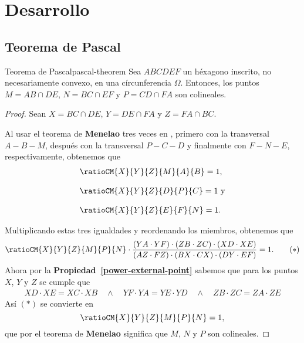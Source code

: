 \section{Desarrollo}



\subsection{Teorema de Pascal}

\begin{section-theorem.tcb}{Teorema de Pascal}{pascal-theorem}
    Sea $ABCDEF$ un héxagono inscrito, no necesariamente convexo, en una círcunferencia $\Omega$.
    Entonces, los puntos $M = AB \cap DE$, $N = BC \cap EF$ y $P = CD \cap FA$ son colineales.
\end{section-theorem.tcb}

\begin{proof}
    Sean $X = BC \cap DE$, $Y = DE \cap FA$ y $Z = FA \cap BC$.

    \begin{multicols}{2}
        \begin{figure}[H]
            \centering
            
        \end{figure}
        Al usar el teorema de \textbf{Menelao} tres veces en , primero con la transversal $A - B - M$, después con la transversal $P - C - D$ y finalmente con $F - N - E$, respectivamente, obtenemos que
        \begin{align*}
            &\ratioCM{X}{Y}{Z}{M}{A}{B} = 1,\\[3mm]
            &\ratioCM{X}{Y}{Z}{D}{P}{C} = 1\ \text{y}\\[3mm]
            &\ratioCM{X}{Y}{Z}{E}{F}{N} = 1.
        \end{align*}
    \end{multicols}
    \vspace{-10mm}
    Multiplicando estas tres igualdades y reordenando los miembros, obtenemos que
    \begin{align*}
        \ratioCM{X}{Y}{Z}{M}{P}{N} \cdot \frac{(YA\cdot YF) \cdot (ZB\cdot ZC) \cdot (XD\cdot XE)}{(AZ\cdot FZ) \cdot (BX \cdot CX) \cdot (DY\cdot EF)} = 1. \tag{$\ast$}
    \end{align*}
    Ahora por la \textbf{Propiedad~\ref{power-external-point}} sabemos que para los puntos $X$, $Y$ y $Z$ se cumple que
    \begin{align*}
        XD \cdot XE = XC \cdot XB \quad \land \quad
        YF \cdot YA = YE \cdot YD \quad \land \quad
        ZB \cdot ZC = ZA \cdot ZE
    \end{align*}
    Así $(\ast)$ se convierte en
    \[
        \ratioCM{X}{Y}{Z}{M}{P}{N} = 1,
    \]
    que por el teorema de \textbf{Menelao} significa que $M$, $N$ y $P$ son colineales.
\end{proof}

